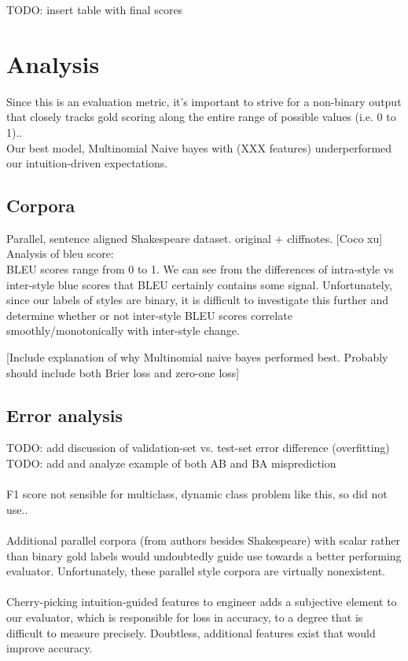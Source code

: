 \documentclass[letterpaper, 10 pt, conference]{ieeeconf}  %
\begin{document}
    TODO: insert table with final scores
  \section{Analysis}
    Since this is an evaluation metric, it's important to strive for a non-binary output that closely tracks gold scoring along the entire range of possible values (i.e. 0 to 1)..\\
    Our best model, Multinomial Naive bayes with (XXX features) underperformed our intuition-driven expectations.

  \subsection{Corpora}
    Parallel, sentence aligned Shakespeare dataset. original + cliffnotes. [Coco xu] \\
    Analysis of bleu score:\\


  BLEU scores range from 0 to 1. We can see from the differences of intra-style vs inter-style blue scores that BLEU certainly contains some signal. Unfortunately, since our labels of styles are binary, it is difficult to investigate this further and determine whether or not inter-style BLEU scores correlate smoothly/monotonically with inter-style change.

  [Include explanation of why Multinomial naive bayes performed best. Probably should include both Brier loss and zero-one loss]

  \subsection{Error analysis}
      TODO: add discussion of validation-set vs. test-set error difference (overfitting)\\
      TODO: add and analyze example of both AB and BA misprediction\\ \\
      F1 score not sensible for multiclass, dynamic class problem like this, so did not use..\\ \\

      Additional parallel corpora (from authors besides Shakespeare) with scalar rather than binary gold labels would undoubtedly guide use towards a better performing evaluator. Unfortunately, these parallel style corpora are virtually nonexistent.
      \\ \\
      Cherry-picking intuition-guided features to engineer adds a subjective element to our evaluator, which is responsible for loss in accuracy, to a degree that is difficult to measure precisely. Doubtless, additional features exist that would improve accuracy.
\end{document}
